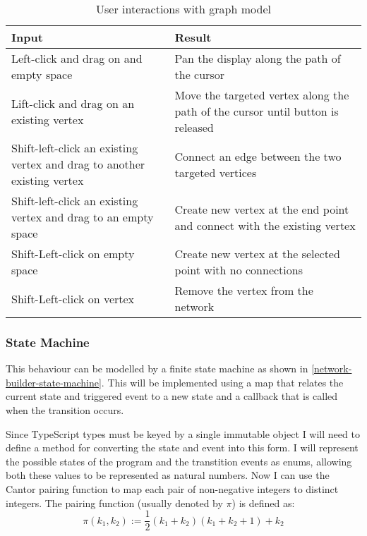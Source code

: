         \begin{table}
            \centering
            \begin{tabular}{|p{}|p{}|}
                \hline
                \textbf{Input} & \textbf{Result}\\
                \hline
                Left-click and drag on and empty space & Pan the display along the path of the cursor\\\hline

                Lift-click and drag on an existing vertex & Move the targeted vertex along the path of the cursor until button is released\\\hline

                Shift-left-click an existing vertex and drag to another existing vertex & Connect an edge between the two targeted vertices\\\hline

                Shift-left-click an existing vertex and drag to an empty space & Create new vertex at the end point and connect with the existing vertex\\\hline

                Shift-Left-click on empty space & Create new vertex at the selected point with no connections\\\hline

                Shift-Left-click on vertex & Remove the vertex from the network\\\hline
            \end{tabular}
            \caption{User interactions with graph model}
            \label{user-interaction-specification}
        \end{table}

        \subsubsection{State Machine}

            This behaviour can be modelled by a finite state machine as shown in \autoref{network-builder-state-machine}. This will be implemented using a map that relates the current state and triggered event to a new state and a callback that is called when the transition occurs.

            Since TypeScript  types must be keyed by a single immutable object I will need to define a method for converting the state and event into this form. I will represent the possible states of the program and the transtition events as enums, allowing both these values to be represented as natural numbers. Now I can use the Cantor pairing function \cite{cantor-pairing-function} to map each pair of non-negative integers to distinct integers. The pairing function (usually denoted by $\pi$) is defined as: \[\pi(k_1, k_2) := \frac{1}{2}(k_1 + k_2)(k_1 + k_2 + 1) + k_2\]

